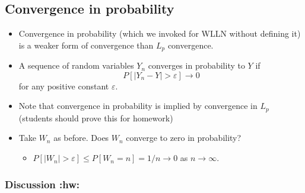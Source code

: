 \documentclass[11pt]{article}
\begin{document}
\subsection{Convergence in probability}
\label{sec-1-3}

\begin{itemize}
\item Convergence in probability (which we invoked for WLLN without
       defining it) is a weaker form of convergence than $L_p$
       convergence.
\item A sequence of random variables $Y_n$ converges in probability to
       $Y$ if \[ P[\lvert Y_n - Y \rvert > \varepsilon] \to 0 \] for
       any positive constant $\varepsilon$.
\item Note that convergence in probability is implied by convergence
       in $L_p$ (students should prove this for homework)
\item Take $W_n$ as before.  Does $W_n$ converge to zero in probability?
\begin{itemize}
\item $P[\lvert W_n \rvert > \varepsilon] \leq P[W_n = n] = 1/n \to
         0$ as $n \to \infty$.
\end{itemize}
\end{itemize}
\subsubsection{Discussion \textbf{:hw:}}
\label{sec-1-3-1}
\end{document}
